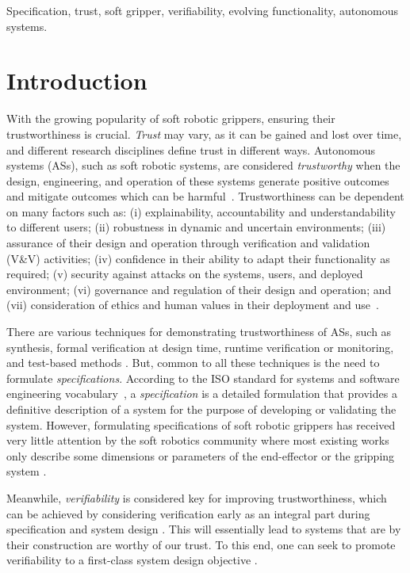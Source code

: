 \documentclass[lettersize,journal]{IEEEtran}
\begin{document}
\begin{IEEEkeywords}
	Specification, trust, soft gripper, verifiability, evolving functionality, autonomous systems.
\end{IEEEkeywords}

\section{Introduction}\label{introduction}
With the growing popularity of soft robotic grippers, ensuring their trustworthiness is crucial. 
\emph{Trust} may vary, as it can be gained and lost over time, and different research disciplines define trust in different ways. 
Autonomous systems (ASs), such as soft robotic systems, are considered \emph{trustworthy} when the design, engineering, and operation of these systems generate positive outcomes and mitigate outcomes which can be harmful~\cite{Naiseh2022}.
Trustworthiness can be dependent on many factors such as: (i) explainability, accountability and understandability to different users; (ii) robustness in dynamic and uncertain environments; (iii) assurance of their design and operation through verification and validation (V\&V) activities; (iv) confidence in their ability to adapt their functionality as required; (v) security against attacks on the systems, users, and deployed environment; (vi) governance and regulation of their design and operation; and (vii) consideration of ethics and human values in their deployment and use~\cite{Naiseh2022}. 

There are various techniques for demonstrating trustworthiness of ASs, such as synthesis, formal verification at design time, runtime verification or monitoring, and test-based methods \cite{Abeywickrama2022}. 
But, common to all these techniques is the need to formulate \emph{specifications}. 	
According to the ISO standard for systems and software engineering vocabulary~\cite{ISO24765:2017}, a \emph{specification} is a detailed formulation that provides a definitive description of a system for the purpose of developing or validating the system. 
However, formulating specifications of soft robotic grippers has received very little attention by the soft robotics community where most existing works only describe some dimensions or parameters of the end-effector or the gripping system \cite{Hong2022,Bhattacharya2019,Tadakuma2020,Loh2014,Nishikawa2019,Mohan2020}.  

Meanwhile, \emph{verifiability} is considered key for improving trustworthiness, which can be achieved by considering verification early as an integral part during specification and system design \cite{Mousavi2022}. This will essentially lead to systems that are by their construction are worthy of our trust. To this end, one can seek to promote verifiability to a first-class system design objective \cite{Eder2021}. 
\end{document}
